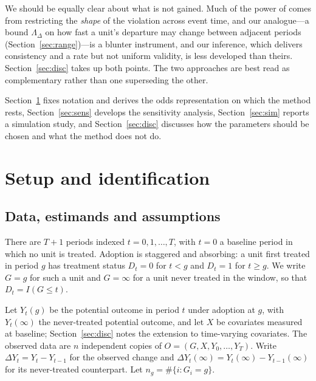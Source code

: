 \documentclass[12pt]{article}
\theoremstyle{remark}
\begin{document}
We should be equally clear about what is not gained. Much of the power of
\citet{rambachan2023honest} comes from restricting the \emph{shape} of the violation
across event time, and our analogue---a bound $\Lambda_\Delta$ on how fast a unit's
departure may change between adjacent periods (Section~\ref{sec:range})---is a blunter
instrument, and our inference, which delivers consistency and a rate but not uniform
validity, is less developed than theirs. Section~\ref{sec:disc} takes up both points. The
two approaches are best read as complementary rather than one superseding the other.

Section~\ref{sec:setup} fixes notation and derives the odds representation on which the
method rests, Section~\ref{sec:sens} develops the sensitivity analysis,
Section~\ref{sec:sim} reports a simulation study, and Section~\ref{sec:disc} discusses how
the parameters should be chosen and what the method does not do.

\section{Setup and identification}
\label{sec:setup}

\subsection{Data, estimands and assumptions}

There are $T+1$ periods indexed $t = 0, 1, \ldots, T$, with $t = 0$ a baseline period in
which no unit is treated. Adoption is staggered and absorbing: a unit first treated in
period $g$ has treatment status $D_t = 0$ for $t < g$ and $D_t = 1$ for $t \ge g$. We
write $G = g$ for such a unit and $G = \infty$ for a unit never treated in the window, so
that $D_t = I(G \le t)$.

Let $Y_t(g)$ be the potential outcome in period $t$ under adoption at $g$, with
$Y_t(\infty)$ the never-treated potential outcome, and let $X$ be covariates measured at
baseline; Section~\ref{sec:disc} notes the extension to time-varying covariates. The
observed data are $n$ independent copies of $O = (G, X, Y_0, \ldots, Y_T)$. Write
$\Delta Y_t = Y_t - Y_{t-1}$ for the observed change and
$\Delta Y_t(\infty) = Y_t(\infty) - Y_{t-1}(\infty)$ for its never-treated counterpart.
Let $n_g = \#\{i : G_i = g\}$.
\end{document}
